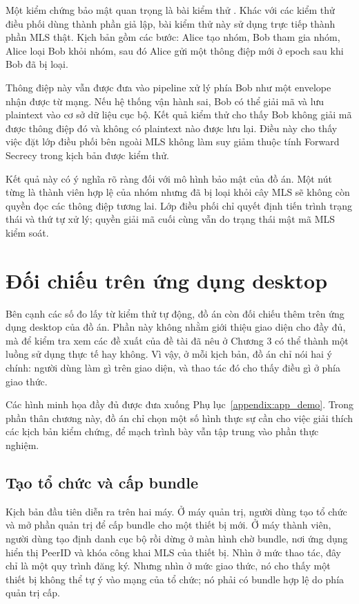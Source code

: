 \documentclass[../DoAn.tex]{subfiles}
\begin{document}
Một kiểm chứng bảo mật quan trọng là bài kiểm thử . Khác với các kiểm thử điều phối dùng thành phần giả lập, bài kiểm thử này sử dụng trực tiếp thành phần MLS thật. Kịch bản gồm các bước: Alice tạo nhóm, Bob tham gia nhóm, Alice loại Bob khỏi nhóm, sau đó Alice gửi một thông điệp mới ở epoch sau khi Bob đã bị loại.
	
Thông điệp này vẫn được đưa vào pipeline xử lý phía Bob như một envelope nhận được từ mạng. Nếu hệ thống vận hành sai, Bob có thể giải mã và lưu plaintext vào cơ sở dữ liệu cục bộ. Kết quả kiểm thử cho thấy Bob không giải mã được thông điệp đó và không có plaintext nào được lưu lại. Điều này cho thấy việc đặt lớp điều phối bên ngoài MLS không làm suy giảm thuộc tính Forward Secrecy trong kịch bản được kiểm thử.
	
Kết quả này có ý nghĩa rõ ràng đối với mô hình bảo mật của đồ án. Một nút từng là thành viên hợp lệ của nhóm nhưng đã bị loại khỏi cây MLS sẽ không còn quyền đọc các thông điệp tương lai. Lớp điều phối chỉ quyết định tiến trình trạng thái và thứ tự xử lý; quyền giải mã cuối cùng vẫn do trạng thái mật mã MLS kiểm soát.
	
	\section{Đối chiếu trên ứng dụng desktop}
	\label{sec:prototype_validation}

Bên cạnh các số đo lấy từ kiểm thử tự động, đồ án còn đối chiếu thêm trên ứng dụng desktop của đồ án. Phần này không nhằm giới thiệu giao diện cho đầy đủ, mà để kiểm tra xem các đề xuất của đề tài đã nêu ở Chương 3 có thể thành một luồng sử dụng thực tế hay không. Vì vậy, ở mỗi kịch bản, đồ án chỉ nói hai ý chính: người dùng làm gì trên giao diện, và thao tác đó cho thấy điều gì ở phía giao thức.

Các hình minh họa đầy đủ được đưa xuống Phụ lục~\ref{appendix:app_demo}. Trong phần thân chương này, đồ án chỉ chọn một số hình thực sự cần cho việc giải thích các kịch bản kiểm chứng, để mạch trình bày vẫn tập trung vào phần thực nghiệm.

	\subsection{Tạo tổ chức và cấp bundle}

Kịch bản đầu tiên diễn ra trên hai máy. Ở máy quản trị, người dùng tạo tổ chức và mở phần quản trị để cấp bundle cho một thiết bị mới. Ở máy thành viên, người dùng tạo định danh cục bộ rồi dừng ở màn hình chờ bundle, nơi ứng dụng hiển thị PeerID và khóa công khai MLS của thiết bị. Nhìn ở mức thao tác, đây chỉ là một quy trình đăng ký. Nhưng nhìn ở mức giao thức, nó cho thấy một thiết bị không thể tự ý vào mạng của tổ chức; nó phải có bundle hợp lệ do phía quản trị cấp.
\end{document}
